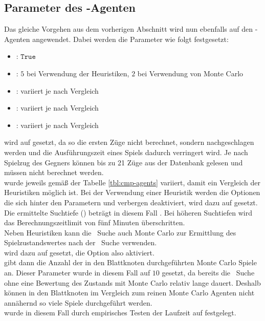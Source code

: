\subsection{Parameter des \mxZitat{\abp}-Agenten}
\label{eval:agents:params:subsec-ab}
Das gleiche Vorgehen aus dem vorherigen Abschnitt wird nun ebenfalls auf den \mxZitat{\abp}-Agenten angewendet.
Dabei werden die Parameter wie folgt festgesetzt:
\begin{itemize}
\item {}: $\mathtt{True}$
\item {}: $5$ bei Verwendung der Heuristiken, $2$ bei Verwendung von Monte Carlo
\item {}: variiert je nach Vergleich
\item {}: variiert je nach Vergleich
\item {}: variiert je nach Vergleich
\end{itemize}
 wird auf  gesetzt, da so die ersten Züge nicht berechnet, sondern nachgeschlagen werden und die Ausführungszeit eines Spiels dadurch verringert wird. Je nach Spielzug des Gegners können bis zu 21 Züge aus der Datenbank  gelesen und müssen nicht berechnet werden.
\\ wurde jeweils gemäß der Tabelle \ref{tbl:cmp-agents} variiert, damit ein Vergleich der Heuristiken möglich ist. Bei der Verwendung einer Heuristik werden die Optionen die sich hinter den Parametern  und  verbergen deaktiviert,  wird dazu auf  gesetzt. 
Die ermittelte Suchtiefe () beträgt in diesem Fall . Bei höheren Suchtiefen wird das Berechnungszeitlimit von fünf Minuten überschritten.
\vspace{0.5cm}
\\Neben Heuristiken kann die \abab\ Suche auch Monte Carlo zur Ermittlung des Spielzustandswertes nach der \abab\ Suche verwenden.
\\ wird dazu auf  gesetzt, die Option also aktiviert.
\vspace{0.25cm}
\\ gibt dann die Anzahl der in den Blattknoten durchgeführten Monte Carlo Spiele an. Dieser Parameter wurde in diesem Fall auf $10$ gesetzt, da bereits die \abab\ Suche ohne eine Bewertung des Zustands mit Monte Carlo relativ lange dauert. Deshalb können in den Blattknoten im Vergleich zum reinen Monte Carlo Agenten nicht annähernd so viele Spiele durchgeführt werden.
\\ wurde in diesem Fall durch empirisches Testen der Laufzeit auf  festgelegt. 

